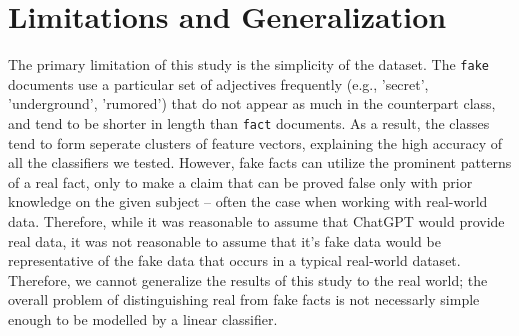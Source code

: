\documentclass[11pt]{article}
\begin{document}
\section{Limitations and Generalization}
The primary limitation of this study is the simplicity of the dataset.
The \texttt{fake} documents use a particular set of adjectives 
frequently (e.g., 'secret', 'underground', 'rumored')
that do not appear as much in the counterpart class, and
tend to be shorter in length than \texttt{fact} documents.
As a result, the classes tend to form seperate clusters of feature vectors,
explaining the high accuracy of all the classifiers we tested. However,
fake facts can utilize the prominent patterns
of a real fact, only to make a claim that can be proved 
false only with prior knowledge on the given subject – often the case when working with real-world data.
Therefore, while it was reasonable to assume that ChatGPT would provide real data,
it was not reasonable to assume that it's fake data would be representative of the fake
data that occurs in a typical real-world dataset. 
Therefore, we cannot generalize the results of this
study to the real world; 
the overall problem of distinguishing real from fake
facts is not necessarly simple enough to be modelled by
a linear classifier.
\end{document}
